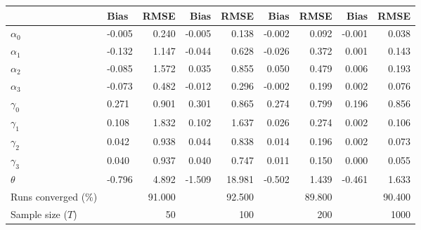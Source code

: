 
\begin{tabular}[t]{llrrrrrrr}
\toprule
  & Bias & RMSE & Bias & RMSE & Bias & RMSE & Bias & RMSE\\
\midrule
$\alpha_{0}$ & -0.005 & 0.240 & -0.005 & 0.138 & -0.002 & 0.092 & -0.001 & 0.038\\
$\alpha_{1}$ & -0.132 & 1.147 & -0.044 & 0.628 & -0.026 & 0.372 & 0.001 & 0.143\\
$\alpha_{2}$ & -0.085 & 1.572 & 0.035 & 0.855 & 0.050 & 0.479 & 0.006 & 0.193\\
$\alpha_{3}$ & -0.073 & 0.482 & -0.012 & 0.296 & -0.002 & 0.199 & 0.002 & 0.076\\
$\gamma_{0}$ & 0.271 & 0.901 & 0.301 & 0.865 & 0.274 & 0.799 & 0.196 & 0.856\\
$\gamma_{1}$ & 0.108 & 1.832 & 0.102 & 1.637 & 0.026 & 0.274 & 0.002 & 0.106\\
$\gamma_{2}$ & 0.042 & 0.938 & 0.044 & 0.838 & 0.014 & 0.196 & 0.002 & 0.073\\
$\gamma_{3}$ & 0.040 & 0.937 & 0.040 & 0.747 & 0.011 & 0.150 & 0.000 & 0.055\\
$\theta$ & -0.796 & 4.892 & -1.509 & 18.981 & -0.502 & 1.439 & -0.461 & 1.633\\
Runs converged (\%) &  & 91.000 &  & 92.500 &  & 89.800 &  & 90.400\\
Sample size ($T$) &  & 50 &  & 100 &  & 200 &  & 1000\\
\bottomrule
\end{tabular}
